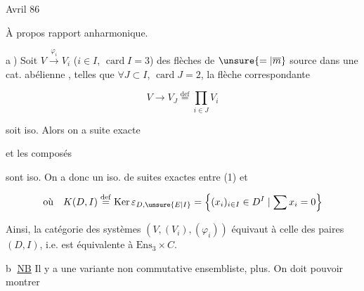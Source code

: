 
Avril 86

À propos rapport anharmonique.

\textcircled{a)} Soit $V\xrightarrow{\varphi_i}V_i$ ($i\in I$, $\operatorname{card} I=3$) des flèches de $\unsure{=|\overline{m}}$ source dans une cat. abélienne , telles que $\forall J\subset I$, $\operatorname{card} J=2$, la flèche correspondante 

\[
 V\longrightarrow V_J\overset{\mathrm{def}}{=}\prod_{i\in J}V_i
\]

soit iso.  Alors on a suite exacte


et les  composés


sont iso. On a donc un iso. de suites exactes entre (1) et


\[
 \text{où}\quad K(D,I)\overset{\mathrm{def}}{=}\operatorname{Ker}\varepsilon_{D,\unsure{E|I}}
 =\left\{(x_i)_{i\in I}\in D^I\mid\sum x_i=0\right\}
\]

Ainsi, la catégorie des systèmes $(V,(V_i),(\varphi_i))$ équivaut à celle des paires $(D,I)$, i.e. est équivalente à $\mathrm{Ens}_3\times C$.

\textcircled{b} \uline{NB} Il y a une variante non commutative ensembliste,   plus.  On doit pouvoir montrer

